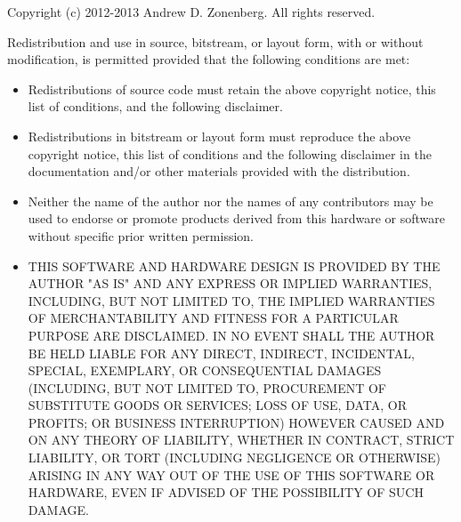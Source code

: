 \documentclass{article}
\begin{document}
Copyright (c) 2012-2013 Andrew D. Zonenberg. All rights reserved.

Redistribution and use in source, bitstream, or layout form, with or without modification, is permitted
provided that the following conditions are met:

\begin{itemize}
\item Redistributions of source code must retain the above copyright notice, this list of conditions, and the following
disclaimer.

\item Redistributions in bitstream or layout form must reproduce the above copyright notice, this list of conditions and
the following disclaimer in the documentation and/or other materials provided with the distribution.

\item Neither the name of the author nor the names of any contributors may be used to endorse or promote products
derived from this hardware or software without specific prior written permission.

\item THIS SOFTWARE AND HARDWARE DESIGN IS PROVIDED BY THE AUTHOR "AS IS" AND ANY EXPRESS OR IMPLIED WARRANTIES, 
INCLUDING, BUT NOT LIMITED TO, THE IMPLIED WARRANTIES OF MERCHANTABILITY AND FITNESS FOR A PARTICULAR PURPOSE ARE 
DISCLAIMED. IN NO EVENT SHALL THE AUTHOR BE HELD LIABLE FOR ANY DIRECT, INDIRECT, INCIDENTAL, SPECIAL, EXEMPLARY, OR 
CONSEQUENTIAL DAMAGES (INCLUDING, BUT NOT LIMITED TO, PROCUREMENT OF SUBSTITUTE GOODS OR SERVICES; LOSS OF USE, 
DATA, OR PROFITS; OR BUSINESS INTERRUPTION) HOWEVER CAUSED AND ON ANY THEORY OF LIABILITY, WHETHER IN CONTRACT, 
STRICT LIABILITY, OR TORT (INCLUDING NEGLIGENCE OR OTHERWISE) ARISING IN ANY WAY OUT OF THE USE OF THIS SOFTWARE OR 
HARDWARE, EVEN IF ADVISED OF THE POSSIBILITY OF SUCH DAMAGE.

\end{itemize}
\end{document}
